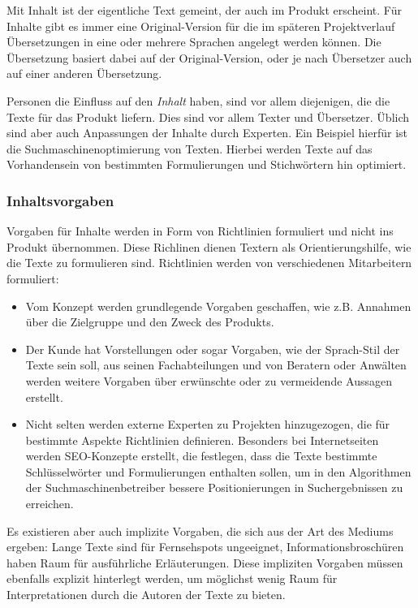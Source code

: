Mit Inhalt ist der eigentliche Text gemeint, der auch im Produkt erscheint. Für Inhalte gibt es immer eine Original-Version für die im späteren Projektverlauf Übersetzungen in eine oder mehrere Sprachen angelegt werden können. Die Übersetzung basiert dabei auf der Original-Version, oder je nach Übersetzer auch auf einer anderen Übersetzung.

Personen die Einfluss auf den \emph{Inhalt} haben, sind vor allem diejenigen, die die Texte für das Produkt liefern. Dies sind vor allem Texter und Übersetzer. Üblich sind aber auch Anpassungen der Inhalte durch Experten. Ein Beispiel hierfür ist die Suchmaschinenoptimierung von Texten. Hierbei werden Texte auf das Vorhandensein von bestimmten Formulierungen und Stichwörtern hin optimiert. 

\subsubsection{Inhaltsvorgaben}

Vorgaben für Inhalte werden in Form von Richtlinien formuliert und nicht ins Produkt übernommen. Diese Richlinen dienen Textern als Orientierungshilfe, wie die Texte zu formulieren sind. Richtlinien werden von verschiedenen Mitarbeitern formuliert: 
\begin{itemize}\itemsep -5pt
\item Vom Konzept werden grundlegende Vorgaben geschaffen, wie z.B. Annahmen über die Zielgruppe und den Zweck des Produkts.
\item Der Kunde hat Vorstellungen oder sogar Vorgaben, wie der Sprach-Stil der Texte sein soll, aus seinen Fachabteilungen und von Beratern oder Anwälten werden weitere Vorgaben über erwünschte oder zu vermeidende Aussagen erstellt.
\item Nicht selten werden externe Experten zu Projekten hinzugezogen, die für bestimmte Aspekte Richtlinien definieren. Besonders bei Internetseiten werden SEO-Konzepte erstellt, die festlegen, dass die Texte bestimmte Schlüsselwörter und Formulierungen enthalten sollen, um in den Algorithmen der Suchmaschinenbetreiber bessere Positionierungen in Suchergebnissen zu erreichen.
\end{itemize}
Es existieren aber auch implizite Vorgaben, die sich aus der Art des Mediums ergeben: Lange Texte sind für Fernsehspots ungeeignet, Informationsbroschüren haben Raum für ausführliche Erläuterungen. Diese impliziten Vorgaben müssen ebenfalls explizit hinterlegt werden, um möglichst wenig Raum für Interpretationen durch die Autoren der Texte zu bieten.

